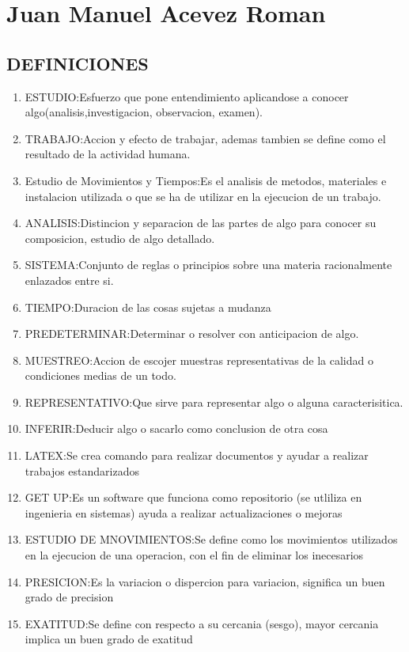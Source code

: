 \section{Juan Manuel Acevez Roman}
\subsection{DEFINICIONES}

\begin{enumerate}
    \item ESTUDIO:Esfuerzo que pone entendimiento aplicandose a conocer algo(analisis,investigacion, observacion, examen).
    \item TRABAJO:Accion y efecto de trabajar, ademas tambien se define como el resultado de la actividad humana.
    \item Estudio de Movimientos y Tiempos:Es el analisis de metodos, materiales e instalacion utilizada o que se ha de utilizar en la ejecucion de un trabajo.
    \item ANALISIS:Distincion y separacion de las partes de algo para conocer su composicion, estudio de algo detallado.
    \item SISTEMA:Conjunto de reglas o principios sobre una materia racionalmente enlazados entre si.
    \item TIEMPO:Duracion de las cosas sujetas a mudanza 
    \item PREDETERMINAR:Determinar o resolver con anticipacion de algo.
    \item MUESTREO:Accion de escojer muestras representativas de la calidad o condiciones medias de un todo.
    \item REPRESENTATIVO:Que sirve para representar algo o alguna caracterisitica.
    \item INFERIR:Deducir algo o sacarlo como conclusion de otra cosa
    \item LATEX:Se crea comando para realizar documentos y ayudar a realizar trabajos estandarizados 
    \item GET UP:Es un software que funciona como repositorio (se utliliza en ingenieria en sistemas) ayuda a realizar actualizaciones o mejoras 
    \item ESTUDIO DE MNOVIMIENTOS:Se define como los movimientos utilizados en la ejecucion de una operacion, con el fin de eliminar los inecesarios
    \item PRESICION:Es la variacion o dispercion para variacion, significa un buen grado de precision 
    \item EXATITUD:Se define con respecto a su cercania (sesgo), mayor cercania implica un buen grado de exatitud

\end{enumerate}
